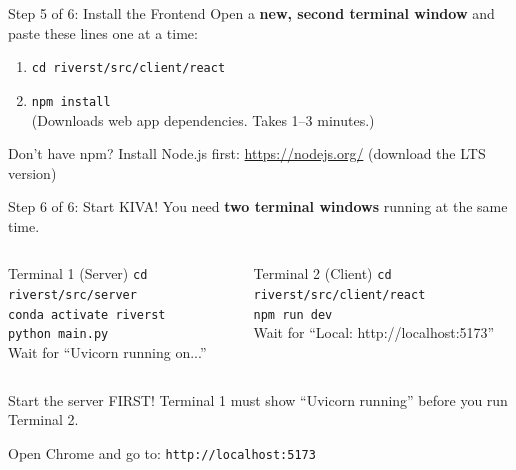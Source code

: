 \documentclass[aspectratio=169]{beamer}
\begin{document}
\begin{frame}{Step 5 of 6: Install the Frontend}
Open a \textbf{new, second terminal window} and paste these lines one at a time:

\vspace{0.3cm}

\begin{enumerate}
    \setlength\itemsep{0.5cm}
    \item \texttt{cd riverst/src/client/react}
    \item \texttt{npm install}\\
          {\small\textcolor{kivagray}{(Downloads web app dependencies. Takes 1--3 minutes.)}}
\end{enumerate}

\vspace{0.3cm}

\begin{block}{Don't have npm?}
Install Node.js first: \url{https://nodejs.org/} (download the LTS version)
\end{block}
\end{frame}

\begin{frame}{Step 6 of 6: Start KIVA!}
You need \textbf{two terminal windows} running at the same time.

\vspace{0.2cm}

\begin{columns}[T]
\begin{block}{Terminal 1 (Server)}
\small
\texttt{cd riverst/src/server}\\
\texttt{conda activate riverst}\\
\texttt{python main.py}\\[0.2cm]
\textcolor{kivagray}{\footnotesize Wait for ``Uvicorn running on...''}
\end{block}

\begin{block}{Terminal 2 (Client)}
\small
\texttt{cd riverst/src/client/react}\\
\texttt{npm run dev}\\[0.2cm]
\textcolor{kivagray}{\footnotesize Wait for ``Local: http://localhost:5173''}
\end{block}
\end{columns}

\vspace{0.3cm}

\begin{alertblock}{Start the server FIRST!}
Terminal 1 must show ``Uvicorn running'' before you run Terminal 2.
\end{alertblock}

\vspace{0.2cm}

\begin{center}
\large Open Chrome and go to: \texttt{http://localhost:5173}
\end{center}
\end{frame}
\end{document}
